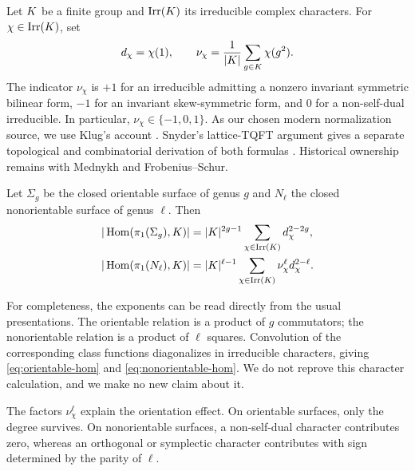 Let $K$ be a finite group and $\operatorname{Irr}(K)$ its irreducible complex characters.
For $\chi\in\operatorname{Irr}(K)$, set
\begin{equation}
 d_\chi=\chi(1),\qquad
 \nu_\chi=\frac1{|K|}\sum_{g\in K}\chi(g^2).
 \label{eq:fs-definition}
\end{equation}
The indicator $\nu_\chi$ is $+1$ for an irreducible admitting a nonzero
invariant symmetric bilinear form, $-1$ for an invariant skew-symmetric form,
and $0$ for a non-self-dual irreducible.  In particular,
$\nu_\chi\in\{-1,0,1\}$.  As our chosen modern normalization source, we use
Klug's account \cite[Corollary~1 and the closed-surface displays following
Theorem~3.1]{Klug2025}.  Snyder's lattice-TQFT argument gives a separate
topological and combinatorial derivation of both formulas \cite{Snyder2007}.
Historical ownership remains with Mednykh and Frobenius--Schur.

\begin{proposition}
\label{prop:surface-hom}
Let $\Sigma_g$ be the closed orientable surface of genus $g$ and $N_\ell$ the
closed nonorientable surface of genus $\ell$.  Then
\begin{align}
 |\operatorname{Hom}(\pi_1(\Sigma_g),K)|
 &=|K|^{2g-1}\sum_{\chi\in\operatorname{Irr}(K)}d_\chi^{2-2g},
 \label{eq:orientable-hom}\\
 |\operatorname{Hom}(\pi_1(N_\ell),K)|
 &=|K|^{\ell-1}\sum_{\chi\in\operatorname{Irr}(K)}
      \nu_\chi^{\ell}d_\chi^{2-\ell}.
 \label{eq:nonorientable-hom}
\end{align}
\end{proposition}

For completeness, the exponents can be read directly from the usual
presentations.  The orientable relation is a product of $g$ commutators; the
nonorientable relation is a product of $\ell$ squares.  Convolution of the
corresponding class functions diagonalizes in irreducible characters, giving
\eqref{eq:orientable-hom} and \eqref{eq:nonorientable-hom}.  We do not reprove
this character calculation, and we make no new claim about it.

The factors $\nu_\chi^\ell$ explain the orientation effect.  On orientable
surfaces, only the degree survives.  On nonorientable surfaces, a
non-self-dual character contributes zero, whereas an orthogonal or symplectic
character contributes with sign determined by the parity of $\ell$.
